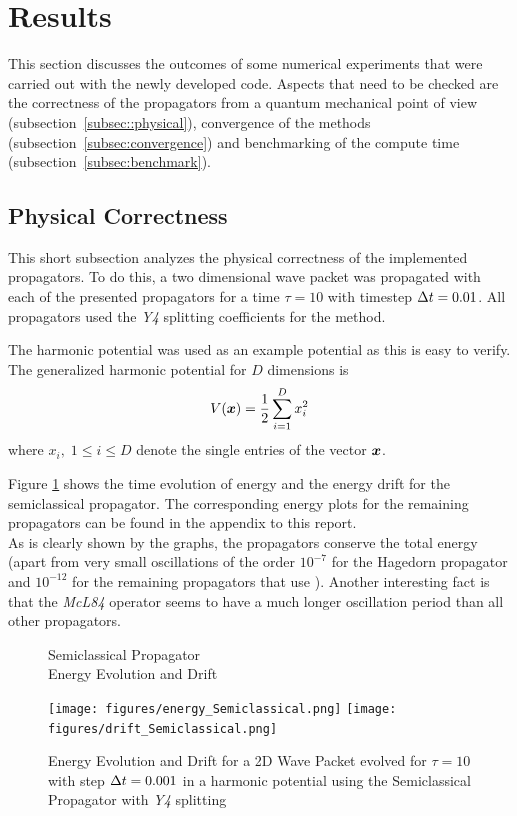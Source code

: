 \section{Results}
\label{sec:results}
%
This section discusses the outcomes of some numerical experiments that were carried out with the newly developed code.
Aspects that need to be checked are the correctness of the propagators from a quantum mechanical point of view (subsection~\ref{subsec::physical}), convergence of the methods (subsection~\ref{subsec:convergence}) and benchmarking of the compute time (subsection~\ref{subsec:benchmark}).

\subsection{Physical Correctness}
\label{subsec:physical}
%
This short subsection analyzes the physical correctness of the implemented propagators.
To do this, a two dimensional wave packet was propagated with each of the presented propagators for a time $\tau = 10$ with timestep $\Delta t = 0.01$.
All propagators used the \emph{Y4} splitting coefficients for the  method.
\par\medskip
%
The harmonic potential was used as an example potential as this is easy to verify.
The generalized harmonic potential for $D$ dimensions is
\begin{align}
	V(\bm{x}) = 
	\frac{1}{2} \sum_{i=1}^D x_i^2
\end{align}
%
where $x_i, \; 1 \le i \le D$ denote the single entries of the vector $\bm{x}$.
\par\medskip
%
Figure \ref{fig:energy_Semiclassical} shows the time evolution of energy and the energy drift for the semiclassical propagator. The corresponding energy plots for the remaining propagators can be found in the appendix to this report. \\
As is clearly shown by the graphs, the propagators conserve the total energy (apart from very small oscillations of the order $10^{-7}$ for the Hagedorn propagator and $10^{-12}$ for the remaining propagators that use ).
Another interesting fact is that the \emph{McL84} operator seems to have a much longer oscillation period than all other propagators.
%
\begin{figure}[ht]
	\centering
	\begin{minipage}[c]{\textwidth}
		\begin{center}
			\large Semiclassical Propagator \\[1mm]
			\normalsize Energy Evolution and Drift
			\vspace{4mm}
		\end{center}
	\end{minipage}
	\texttt{[image: figures/energy\_Semiclassical.png]}
	\texttt{[image: figures/drift\_Semiclassical.png]}
	\caption{Energy Evolution and Drift for a 2D Wave Packet evolved for $\tau = 10$ with step $\Delta t = 0.001$ in a harmonic potential using the Semiclassical Propagator with \emph{Y4} splitting}
	\label{fig:energy_Semiclassical}
\end{figure}


